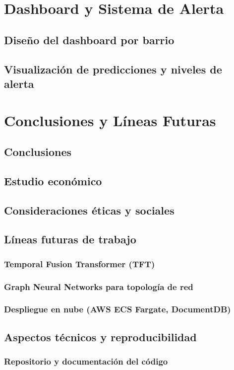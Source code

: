 \documentclass[12pt, a4paper]{article}
\begin{document}
\section{Dashboard y Sistema de Alerta}

\subsection{Diseño del dashboard por barrio}
\subsection{Visualización de predicciones y niveles de alerta}

\section{Conclusiones y Líneas Futuras}

\subsection{Conclusiones}
\subsection{Estudio económico}
\subsection{Consideraciones éticas y sociales}
\subsection{Líneas futuras de trabajo}
\subsubsection{Temporal Fusion Transformer (TFT)}
\subsubsection{Graph Neural Networks para topología de red}
\subsubsection{Despliegue en nube (AWS ECS Fargate, DocumentDB)}
\subsection{Aspectos técnicos y reproducibilidad}
\subsubsection{Repositorio y documentación del código}
\end{document}
